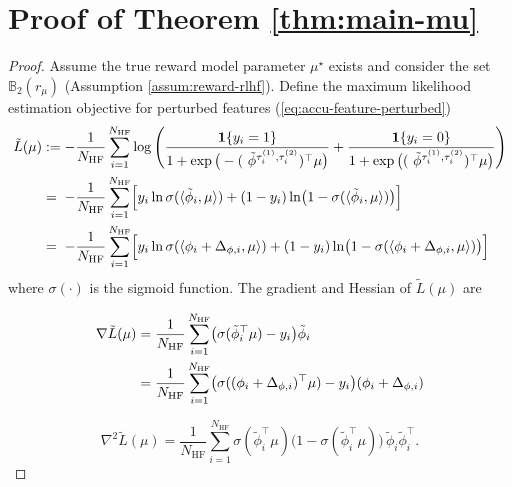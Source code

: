 \documentclass[10pt]{article} %
\theoremstyle{plain}
\theoremstyle{definition}
\theoremstyle{remark}
\newcommand{\bB}{\mathbb{B}}
\begin{document}
\section{Proof of Theorem \ref{thm:main-mu}}
\begin{proof}\label{proof:thm-rlhf}
 Assume the true reward model parameter $\mu^\star$ exists and consider the set $\bB_2(r_\mu)$ (Assumption \ref{assum:reward-rlhf}). Define the maximum likelihood estimation objective for perturbed features (\ref{eq:accu-feature-perturbed})
\begin{align}
\tilde L(\mu) &:=-\frac{1}{N_{\mathrm{HF}}}\sum_{i=1}^{N_{\mathrm{HF}}} \log\left(\frac{\mathbf{1}\{y_i = 1\}}{1 + \exp\big(-(\,\,\tilde{\phi}^{\tau^{(1)}_i,\tau^{(2)}_i})^\top\mu\big)}+\frac{\mathbf{1}\{y_i = 0\}}{1 +\exp\big((\,\,\tilde{\phi}^{\tau^{(1)}_i, \tau^{(2)}_i})^\top\mu\big)} \right)\notag\\
& =\; -\frac{1}{N_{\mathrm{HF}}}\sum_{i=1}^{{N_{\mathrm{HF}}}} \Bigl[y_i\ln\sigma(\langle \tilde\phi_i,\mu\rangle)+(1-y_i)\ln\bigl(1-\sigma(\langle \tilde\phi_i,\mu\rangle)\bigr)\Bigr]\notag\\
&=\; -\frac{1}{N_{\mathrm{HF}}}\sum_{i=1}^{{N_{\mathrm{HF}}}} \Bigl[y_i\ln\sigma(\langle \phi_i+\Delta_{\phi,i},\mu\rangle)+(1-y_i)\ln\bigl(1-\sigma(\langle \phi_i+\Delta_{\phi,i},\mu\rangle)\bigr)\Bigr] \label{eq:likelihood-perturbed}
\end{align}
where $\sigma(\cdot)$ is the sigmoid function. The gradient and Hessian of $\tilde L(\mu)$ are

\begin{align}
\nabla \tilde L(\mu)&=\frac{1}{N_{\mathrm{HF}}}\sum_{i=1}^{N_{\mathrm{HF}}}
\bigl(\sigma(\tilde\phi_i^\top\mu)-y_i\bigr)\tilde\phi_i\notag\\
&=\frac{1}{N_{\mathrm{HF}}}\sum_{i=1}^{N_{\mathrm{HF}}}
\bigl(\sigma((\phi_i+ \Delta_{\phi,i})^\top\mu)-y_i\bigr)(\phi_i+ \Delta_{\phi,i})\label{mle-grad}
\end{align}

\begin{equation}\label{eq:mle-hessian}
\nabla^2 \tilde L(\mu)
=\frac{1}{N_{\mathrm{HF}}}\sum_{i=1}^{N_{\mathrm{HF}}}\sigma(\tilde\phi_i^\top\mu)\bigl(1-\sigma(\tilde\phi_i^\top\mu)\bigr)\,
\tilde\phi_i\tilde\phi_i^\top.
\end{equation}


\end{proof}
\end{document}
